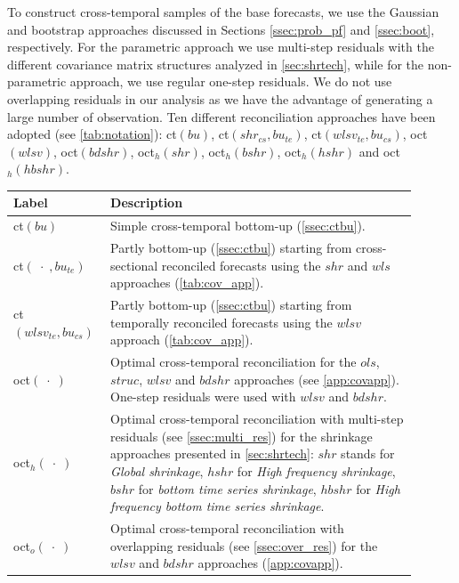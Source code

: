 \documentclass[12pt]{article}
\theoremstyle{definition}
\begin{document}
To construct cross-temporal samples of the base forecasts, we use the Gaussian and bootstrap approaches discussed in Sections \ref{ssec:prob_pf} and \ref{ssec:boot}, respectively. For the parametric approach we use multi-step residuals with the different covariance matrix structures analyzed in \autoref{sec:shrtech}, while for the non-parametric approach, we use regular one-step residuals. We do not use overlapping residuals in our analysis as we have the advantage of generating a large number of observation. Ten different reconciliation approaches have been adopted (see \autoref{tab:notation}): ct$(bu)$, ct$(shr_{cs}, bu_{te})$, ct$(wlsv_{te}, bu_{cs})$, oct$(wlsv)$, oct$(bdshr)$, oct$_h(shr)$, oct$_h(bshr)$, oct$_h(hshr)$ and oct$_h(hbshr)$.

\begin{table}[!th]
	\centering
	{\small
	\begin{tabular}{M{0.175\linewidth}|L{0.725\linewidth}}
		\toprule
		\textbf{Label} & \textbf{Description} \\
		\midrule
		ct$(bu)$ & Simple cross-temporal bottom-up (\autoref{ssec:ctbu}). \\
		\addlinespace[0.15cm]
		ct$(\;\cdot\;, bu_{te})$ & Partly bottom-up (\autoref{ssec:ctbu}) starting from cross-sectional reconciled forecasts using the $shr$ and $wls$ approaches (\autoref{tab:cov_app}).\\
		\addlinespace[0.15cm]
		ct$(wlsv_{te}, bu_{cs})$ & Partly bottom-up (\autoref{ssec:ctbu}) starting from temporally reconciled forecasts using the $wlsv$ approach (\autoref{tab:cov_app}).\\
		\addlinespace[0.15cm]
		oct$(\;\cdot\;)$ & Optimal cross-temporal reconciliation for the $ols$, $struc$, $wlsv$ and $bdshr$ approaches (see \autoref{app:covapp}). One-step residuals were used with $wlsv$ and $bdshr$. \\
		\addlinespace[0.15cm]
		oct$_h(\;\cdot\;)$ & Optimal cross-temporal reconciliation with multi-step residuals (see \autoref{ssec:multi_res}) for the shrinkage approaches presented in \autoref{sec:shrtech}: $shr$ stands for \textit{Global shrinkage}, $hshr$ for \textit{High frequency shrinkage}, $bshr$ for \textit{bottom time series shrinkage}, $hbshr$ for \textit{High frequency bottom time series shrinkage}.\\
		\addlinespace[0.15cm]
		oct$_o(\;\cdot\;)$ & Optimal cross-temporal reconciliation with overlapping residuals (see \autoref{ssec:over_res}) for the $wlsv$ and $bdshr$ approaches (\autoref{app:covapp}). \\

\end{tabular}}
\end{table}
\end{document}
